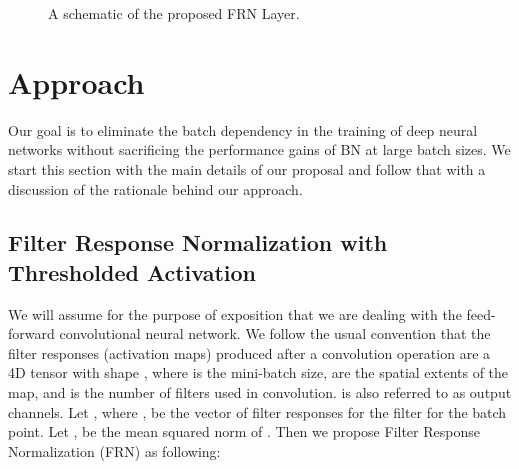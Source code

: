 \documentclass[10pt,twocolumn,letterpaper]{article}
\newcommand{\batchnorm}{BN}
\newcommand{\momentnorm}{FRN}
\begin{document}
\begin{figure}[t]
  \caption{A schematic of the proposed FRN Layer.}
  \label{fig:FRNlayer}
  \vspace{-0.5cm}
\end{figure}


\section{Approach}

Our goal is to eliminate the batch dependency in the training of deep neural networks without sacrificing the performance gains of \batchnorm{} at large batch sizes. We start this section with the main details of our proposal and follow that with a discussion of the rationale behind our approach.

\subsection{Filter Response Normalization with Thresholded Activation}
\label{sec:frn}

We will assume for the purpose of exposition that we are dealing with the feed-forward convolutional neural network. We follow the usual convention that the filter responses (activation maps) produced after a convolution operation are a 4D tensor  with shape , where  is the mini-batch size,  are the spatial extents of the map, and  is the number of filters used in convolution.  is also referred to as output channels. Let , where , be the vector of filter responses for the  filter for the  batch point. 
Let , be the mean squared norm of . Then we propose Filter Response Normalization (\momentnorm{}) as following:
\end{document}
